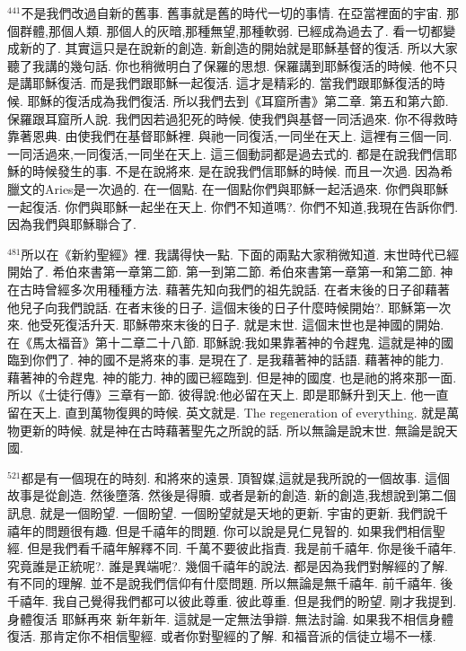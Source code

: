 \documentclass{book}
\begin{document}
$^{441}$不是我們改過自新的舊事.
舊事就是舊的時代一切的事情.
在亞當裡面的宇宙.
那個群體,那個人類.
那個人的灰暗,那種無望,那種軟弱.
已經成為過去了.
看一切都變成新的了.
其實這只是在說新的創造.
新創造的開始就是耶穌基督的復活.
所以大家聽了我講的幾句話.
你也稍微明白了保羅的思想.
保羅講到耶穌復活的時候.
他不只是講耶穌復活.
而是我們跟耶穌一起復活.
這才是精彩的.
當我們跟耶穌復活的時候.
耶穌的復活成為我們復活.
所以我們去到《耳窟所書》第二章.
第五和第六節.
保羅跟耳窟所人說.
我們因若過犯死的時候.
使我們與基督一同活過來.
你不得救時靠著恩典.
由使我們在基督耶穌裡.
與祂一同復活,一同坐在天上.
這裡有三個一同.
一同活過來,一同復活,一同坐在天上.
這三個動詞都是過去式的.
都是在說我們信耶穌的時候發生的事.
不是在說將來.
是在說我們信耶穌的時候.
而且一次過.
因為希臘文的Aries是一次過的.
在一個點.
在一個點你們與耶穌一起活過來.
你們與耶穌一起復活.
你們與耶穌一起坐在天上.
你們不知道嗎?.
你們不知道,我現在告訴你們.
因為我們與耶穌聯合了.

$^{481}$所以在《新約聖經》裡.
我講得快一點.
下面的兩點大家稍微知道.
末世時代已經開始了.
希伯來書第一章第二節.
第一到第二節.
希伯來書第一章第一和第二節.
神在古時曾經多次用種種方法.
藉著先知向我們的祖先說話.
在者末後的日子卻藉著他兒子向我們說話.
在者末後的日子.
這個末後的日子什麼時候開始?.
耶穌第一次來.
他受死復活升天.
耶穌帶來末後的日子.
就是末世.
這個末世也是神國的開始.
在《馬太福音》第十二章二十八節.
耶穌說:我如果靠著神的令趕鬼.
這就是神的國臨到你們了.
神的國不是將來的事.
是現在了.
是我藉著神的話語.
藉著神的能力.
藉著神的令趕鬼.
神的能力.
神的國已經臨到.
但是神的國度.
也是祂的將來那一面.
所以《士徒行傳》三章有一節.
彼得說:他必留在天上.
即是耶穌升到天上.
他一直留在天上.
直到萬物復興的時候.
英文就是.
The regeneration of everything.
就是萬物更新的時候.
就是神在古時藉著聖先之所說的話.
所以無論是說末世.
無論是說天國.

$^{521}$都是有一個現在的時刻.
和將來的遠景.
頂智媒,這就是我所說的一個故事.
這個故事是從創造.
然後墮落.
然後是得贖.
或者是新的創造.
新的創造,我想說到第二個訊息.
就是一個盼望.
一個盼望.
一個盼望就是天地的更新.
宇宙的更新.
我們說千禧年的問題很有趣.
但是千禧年的問題.
你可以說是見仁見智的.
如果我們相信聖經.
但是我們看千禧年解釋不同.
千萬不要彼此指責.
我是前千禧年.
你是後千禧年.
究竟誰是正統呢?.
誰是異端呢?.
幾個千禧年的說法.
都是因為我們對解經的了解.
有不同的理解.
並不是說我們信仰有什麼問題.
所以無論是無千禧年.
前千禧年.
後千禧年.
我自己覺得我們都可以彼此尊重.
彼此尊重.
但是我們的盼望.
剛才我提到.
身體復活 耶穌再來 新年新年.
這就是一定無法爭辯.
無法討論.
如果我不相信身體復活.
那肯定你不相信聖經.
或者你對聖經的了解.
和福音派的信徒立場不一樣.
\end{document}
